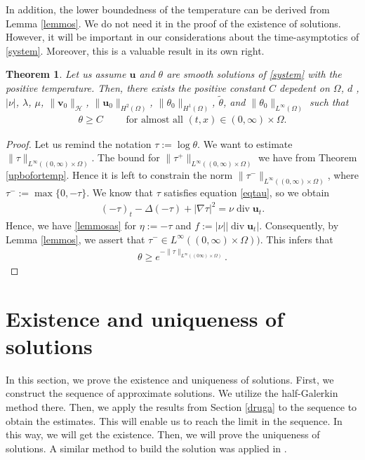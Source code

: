 \documentclass[11pt]{article}
\numberwithin{equation}{section}
\theoremstyle{plain}
\newtheorem{tw}[defi]{Theorem}
\newcommand\bb[1]{\mathbf{#1}}
\newcommand{\tn}{\Omega}
\newcommand{\htwo}{H^2(\Omega)}
\renewcommand{\hom}{H^1(\tn)}
\renewcommand{\div}{\operatorname{div}}
\newcommand{\bu}{\bb{u}}
\renewcommand{\H}{\mathcal{H}}
\begin{document}
In addition, the lower boundedness of the temperature can be derived from Lemma \ref{lemmos}. We do not need it in the proof of the existence of solutions. However, it will be important in our considerations about the time-asymptotics of \eqref{system}. Moreover, this is a valuable result in its own right.
\begin{tw}\label{downbotemp}
Let us assume $\bu$ and $\theta$ are smooth solutions of \eqref{system} with the positive temperature. Then, there exists the positive constant $C$ depedent on $\Omega$, $d$ ,$|\nu|$, $\lambda$, $\mu$, $\| \bb v_0\|_{\H}$, $\|\bu_0\|_{\htwo}$, $\|\theta_0\|_{\hom}$, $\tilde\theta$, and $\|\theta_0\|_{L^{\infty}(\Omega)}$ such that
\begin{align*}
\theta\geq C\qquad \textrm{ for almost all } (t,x)\in (0,\infty)\times\Omega.
\end{align*}
\end{tw}
\begin{proof}
Let us remind the notation $\tau:=\log\theta$. We want to estimate $\|\tau\|_{L^{\infty}((0,\infty)\times\Omega)}$. The bound for $\|\tau^+\|_{L^{\infty}((0,\infty)\times\Omega)}$ we have from Theorem \ref{upbofortemp}. Hence it is left to constrain the norm $\|\tau^-\|_{L^{\infty}((0,\infty)\times\Omega)}$, where $\tau^-:=\max\{0,-\tau\}$. We know that $\tau$ satisfies equation \eqref{eqtau}, so we obtain
\begin{align*}
(-\tau)_t-\Delta(-\tau)+|\nabla\tau|^2=\nu\div\bu_t.
\end{align*}
Hence, we have \eqref{lemmosas} for $\eta:=-\tau$ and $f:=|\nu||\div\bu_t|$. Consequently, by Lemma \ref{lemmos}, we assert that $\tau^-\in L^{\infty}((0,\infty)\times\tn))$. This infers that
\begin{align*}
\theta\geq e^{-\|\tau\|_{L^{\infty}((0\infty)\times\tn)}}.
\end{align*} 
\end{proof}

\section{Existence and uniqueness of solutions}\label{secexst}
In this section, we prove the existence and uniqueness of solutions. First, we construct the sequence of approximate solutions. We utilize the half-Galerkin method there. Then, we apply the results from Section \ref{druga} to the sequence to obtain the estimates. This will enable us to reach the limit in the sequence. In this way, we will get the existence. Then, we will prove the uniqueness of solutions. A similar method to build the solution was applied in \cite{Biest, BC, CMT}.
\end{document}
